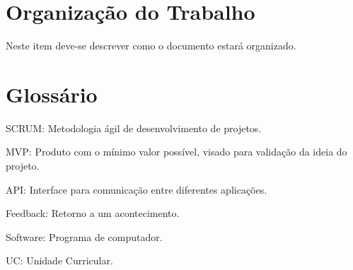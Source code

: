 \section{Organização do Trabalho}

Neste item deve-se descrever como o documento estará organizado.




\section{Glossário}
SCRUM:		Metodologia ágil de desenvolvimento de projetos.

MVP:		Produto com o mínimo valor possível, visado para validação da ideia do projeto.

API:		Interface para comunicação entre diferentes aplicações.

Feedback:	Retorno a um acontecimento.

Software:	Programa de computador.

UC:			Unidade Curricular.

